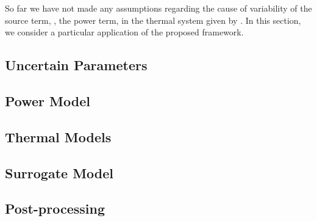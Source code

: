 
So far we have not made any assumptions regarding the cause of variability of the source term, \ie, the power term, in the thermal system given by .
In this section, we consider a particular application of the proposed framework.



\subsection{Uncertain Parameters} 


\subsection{Power Model} 


\subsection{Thermal Models} 


\subsection{Surrogate Model} 


\subsection{Post-processing} 

